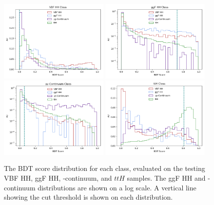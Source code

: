 \begin{figure}[!h]
  \centering
  \includegraphics[width=0.48\textwidth]{chapters/chapter6_vbf/images/bdt_scores/vbf_scores.png}
  \includegraphics[width=0.48\textwidth]{chapters/chapter6_vbf/images/bdt_scores/log_ggf_scores.png}
  \includegraphics[width=0.48\textwidth]{chapters/chapter6_vbf/images/bdt_scores/log_yy_scores.png}
  \includegraphics[width=0.48\textwidth]{chapters/chapter6_vbf/images/bdt_scores/tth_scores.png}
  \caption[The \gls{BDT} score distribution for each class, evaluated on the VBF HH, ggF HH, \yy-continuum, and $ttH$ samples]{The \gls{BDT} score distribution for each class, evaluated on the testing VBF HH, ggF HH, \yy-continuum, and $ttH$ samples. The ggF HH and \yy-continuum distributions are shown on a log scale. A vertical line showing the cut threshold is shown on each distribution.}
  \label{fig:bdt-scores}
\end{figure}

